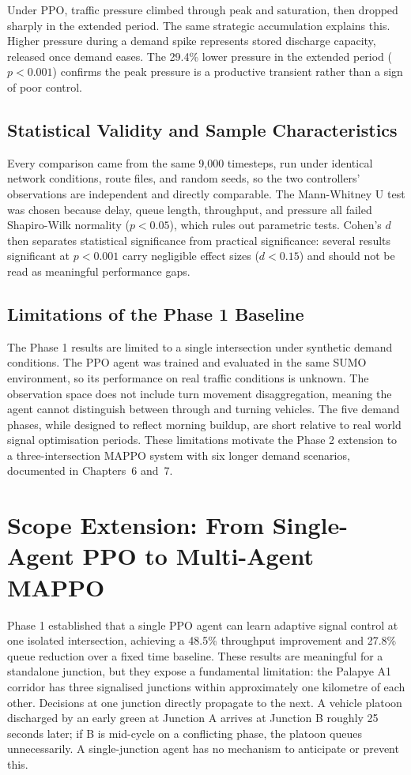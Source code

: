 ﻿\documentclass[11pt, a4paper]{report}
\begin{document}
Under PPO, traffic pressure climbed through peak and saturation, then dropped sharply in the extended period. The same strategic accumulation explains this. Higher pressure during a demand spike represents stored discharge capacity, released once demand eases. The 29.4\% lower pressure in the extended period ($p < 0.001$) confirms the peak pressure is a productive transient rather than a sign of poor control.

\section{Statistical Validity and Sample Characteristics}

Every comparison came from the same 9,000 timesteps, run under identical network conditions, route files, and random seeds, so the two controllers' observations are independent and directly comparable. The Mann-Whitney U test was chosen because delay, queue length, throughput, and pressure all failed Shapiro-Wilk normality ($p < 0.05$), which rules out parametric tests. Cohen's $d$ then separates statistical significance from practical significance: several results significant at $p < 0.001$ carry negligible effect sizes ($d < 0.15$) and should not be read as meaningful performance gaps.

\section{Limitations of the Phase 1 Baseline}

The Phase 1 results are limited to a single intersection under synthetic demand conditions. The PPO agent was trained and evaluated in the same SUMO environment, so its performance on real traffic conditions is unknown. The observation space does not include turn movement disaggregation, meaning the agent cannot distinguish between through and turning vehicles. The five demand phases, while designed to reflect morning buildup, are short relative to real world signal optimisation periods. These limitations motivate the Phase 2 extension to a three-intersection MAPPO system with six longer demand scenarios, documented in Chapters~6 and~7.

\chapter{Scope Extension: From Single-Agent PPO to Multi-Agent MAPPO}
\label{chap:scope_extension}

Phase 1 established that a single PPO agent can learn adaptive signal control at one isolated intersection, achieving a 48.5\% throughput improvement and 27.8\% queue reduction over a fixed time baseline. These results are meaningful for a standalone junction, but they expose a fundamental limitation: the Palapye A1 corridor has three signalised junctions within approximately one kilometre of each other. Decisions at one junction directly propagate to the next. A vehicle platoon discharged by an early green at Junction A arrives at Junction B roughly 25 seconds later; if B is mid-cycle on a conflicting phase, the platoon queues unnecessarily. A single-junction agent has no mechanism to anticipate or prevent this.
\end{document}

